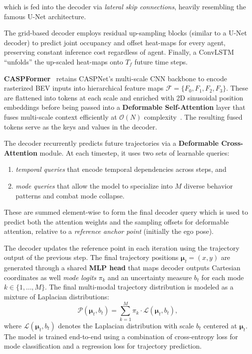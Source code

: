 which is fed into the decoder via \emph{lateral skip connections}, heavily resembling the famous U-Net architecture.

The grid-based decoder employs residual up-sampling blocks (similar to a U-Net decoder) to predict joint occupancy and offset heat-maps for every agent, preserving constant inference cost regardless of agent. Finally, a ConvLSTM ``unfolds'' the up-scaled heat-maps onto \( T_f \) future time steps.

\textbf{CASPFormer}~\cite{caspformerYadav2024} retains CASPNet's multi-scale CNN backbone to encode rasterized BEV inputs into hierarchical feature maps $\mathcal{F} = \{F_0, F_1, F_2, F_3\}$. These are flattened into tokens at each scale and enriched with 2D sinusoidal position embeddings before being passed into a \textbf{Deformable Self-Attention} layer that fuses multi-scale context efficiently at $\mathcal{O}(N)$ complexity~\cite{zhu2021deformabledetr}. The resulting fused tokens serve as the keys and values in the decoder.

The decoder recurrently predicts future trajectories via a \textbf{Deformable Cross-Attention} module. At each timestep, it uses two sets of learnable queries:
\begin{enumerate}
    \item \emph{temporal queries} that encode temporal dependencies across steps, and
    \item \emph{mode queries} that allow the model to specialize into $M$ diverse behavior patterns and combat mode collapse.
\end{enumerate}

These are summed element-wise to form the final decoder query which is used to predict both the attention weights and the sampling offsets for deformable attention, relative to a \emph{reference anchor point} (initially the ego pose).

The decoder updates the reference point in each iteration using the trajectory output of the previous step. The final trajectory positions $\boldsymbol{\mu}_t = (x, y)$ are generated through a shared \textbf{MLP head} that maps decoder outputs Cartesian coordinates as well \emph{mode logits} $\pi_k$ and an uncertainty measure \( b_t \) for each mode \( k \in \{1, \ldots, M\} \). The final multi-modal trajectory distribution is modeled as a mixture of Laplacian distributions:
\begin{equation}
\label{eq:caspformer_trajectory_distribution}
\mathcal{P}(\boldsymbol{\mu}_t, b_t) = \sum_{k=1}^{M} \pi_k \cdot \mathcal{L}(\boldsymbol{\mu}_t, b_t),
\end{equation}
where $\mathcal{L}(\boldsymbol{\mu}_t, b_t)$ denotes the Laplacian distribution with scale $b_t$ centered at $\boldsymbol{\mu}_t$. The model is trained end-to-end using a combination of cross-entropy loss for mode classification and a regression loss for trajectory prediction.

